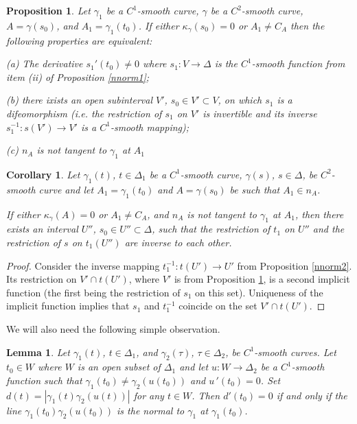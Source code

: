 \documentclass[10pt,a4paper]{amsart}
\newtheorem{lemma}[thm]{Lemma}
\newtheorem{prop}[thm]{Proposition}
\newtheorem{cor}[thm]{Corollary}
\def\g{\gamma}
\begin{document}
\begin{prop} \label{nnorm3}
Let $\g_1$ be a $C^1$-smooth curve, $\g$ be a $C^2$-smooth curve, $A =\g(s_0)$, and
$A_1=\g_1(t_0)$.
If either $\kappa_{\g}(s_0)=0$ or $A_1\neq C_A$ then  the following properties are equivalent:

(a) The derivative $s_1'(t_0) \neq 0$ where  $s_1: V \rightarrow \Delta$ is the $C^1$-smooth function from item (ii) of Proposition
\ref{nnorm1};

(b) there ixists an open subinterval $V'$, $s_0 \in V'\subset V$, on which $s_1$ is a difeomorphism (i.e. the restriction of $s_1$ on $V'$ is invertible and its inverse $s_1^{-1}: s(V') \rightarrow V' $  is a  $C^1$-smooth mapping);

(c) $n_A$ is not  tangent to $\g_1$  at $A_1$

\end{prop}

\begin{cor} \label{homo}
 Let $\g_1(t)$, $t \in \Delta_1$ be a $C^1$-smooth curve, $\g(s)$,  $s \in \Delta$, be  $C^2$-smooth curve and let $A_1= \g_1(t_0)$ and $A= \g(s_0)$ be such that $A_1 \in n_A$.

If either $\kappa_{\g}(A) = 0$ or $A_1\neq C_A$, and $n_A$ is not tangent to $\g_1$ at $A_1$,  then there exists an interval $U''$,  $s_0 \in U'' \subset \Delta$, such that the restriction of $t_1$ on $U''$ and the restriction of $s$ on $t_1(U'')$ are inverse to each other.
\end{cor}

\begin{proof}
Consider the inverse mapping $t_1^{-1}:t(U') \rightarrow U'$ from Proposition \ref{nnorm2}. Its restriction on $V' \cap t(U')$, where $V'$ is from Proposition \ref{nnorm3}, is a second implicit function (the first being the restriction of $s_1$ on this set). Uniqueness of the implicit function implies that $s_1$ and $t_1^{-1}$ coincide on the set $V' \cap t(U')$.

\end{proof}

We will also need the following simple observation.

\begin{lemma}\label{lem} Let $\g_1(t)$, $t \in \Delta_1$, and $\g_2(\tau)$, $ \tau \in \Delta_2$, be $C^1$-smooth curves. Let $t_0 \in W$ where
$W$ is an open subset of $\Delta_1$ and let
$u:W \to \Delta_2$ be a $C^1$-smooth function such that $\g_1(t_0) \neq \g_2(u(t_0))$ and $u\,'(t_0)=0$.
Set $d(t)= |\g_1(t)\g_2(u(t))|$ for any $t \in W$.
Then $d'(t_0)=0$ if and only if the line
$\g_1(t_0)\g_2(u(t_0))$ is the normal to $\g_1$ at $\g_1(t_0)$.
\end{lemma}
\end{document}
